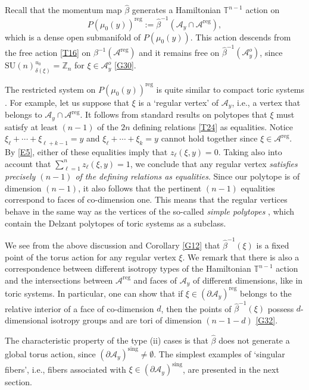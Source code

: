 \documentclass[a4paper,11pt,reqno]{amsart}
\theoremstyle{definition}
\numberwithin{equation}{section}
\newcommand{\be}{\begin{equation}}
\newcommand{\ee}{\end{equation}}
\def\cA{{\mathcal A}}                       %
\def\sing{\mathrm{sing}}                    %
\def\bT{{\mathbb T}}                        %
\def\reg{\mathrm{reg}}                      %
\def\bZ{{\mathbb Z}}                        %
\def\SU{\mathrm{SU}}                        %
\def\reg{\mathrm{reg}}                      %
\begin{document}
Recall that the momentum map $\hat \beta$ generates a Hamiltonian $\bT^{n-1}$ action on
\be
P(\mu_0(y))^\reg:= \hat \beta^{-1}(\cA_y \cap \cA^\reg),
\ee
which is a dense open submanifold of $P(\mu_0(y))$.
This action descends from the free action  \eqref{T16} on $ \beta^{-1}(\cA^\reg)$ and it remains
free  on $\hat \beta^{-1}(\cA_y^o)$, since $\SU(n)_{\delta(\xi)}^{u_0}=\bZ_n$ for $\xi\in \cA_y^o$ \eqref{G30}.

The restricted system  on $P(\mu_0(y))^\reg$ is quite similar to compact toric systems  \cite{A,D}.
For example, let us suppose that $\xi$ is a `regular vertex' of $\cA_y$, i.e., a vertex that belongs to $\cA_y\cap \cA^\reg$.
It follows from standard results on polytopes \cite{PV,Z} that $\xi$ must satisfy at least $(n-1)$ of the $2n$ defining relations  \eqref{T24}
as equalities.
Notice $\xi_\ell + \cdots + \xi_{\ell + k-1} =y$ and
$\xi_\ell + \cdots + \xi_k = y$ cannot hold together
since $\xi \in \cA^\reg$.
By \eqref{E5},  either of these equalities imply that $z_\ell(\xi,y) =0$.
Taking also into account that $\sum_{\ell =1}^n z_\ell(\xi,y) =1$,
we conclude that any regular vertex \emph{satisfies precisely $(n-1)$ of the defining relations as equalities}.
Since our polytope is of dimension $(n-1)$, it also follows that the pertinent $(n-1)$ equalities  correspond
to faces of co-dimension one.
This means that the regular vertices behave in the same way as the vertices of the so-called
\emph{simple polytopes} \cite{PV},  which contain the Delzant polytopes \cite{A,D} of toric systems as  a  subclass.

We see from the above discussion and Corollary \ref{G12} that $\hat \beta^{-1}(\xi)$ is a fixed point
of the torus action for any regular vertex $\xi$.
We remark that there is also a correspondence between different isotropy types of the Hamiltonian $\bT^{n-1}$
action and the intersections between  $\cA^\reg$ and faces of $\cA_y$ of different dimensions,
like in toric systems.
In particular, one can show that
 if  $\xi\in (\partial \cA_y)^\reg$ belongs to the relative interior of a face of co-dimension $d$, then
 the points of  $\hat \beta^{-1}(\xi)$ possess $d$-dimensional isotropy groups and are
 tori of dimension $(n-1-d)$ \eqref{G32}.

The characteristic property of the type (ii) cases is that $\hat \beta$ does not generate
a global torus action, since
$(\partial \cA_y)^\sing \neq \emptyset$.
The simplest examples of `singular fibers', i.e., fibers associated with $\xi\in (\partial \cA_y)^\sing$,
are presented in the next section.
\end{document}
